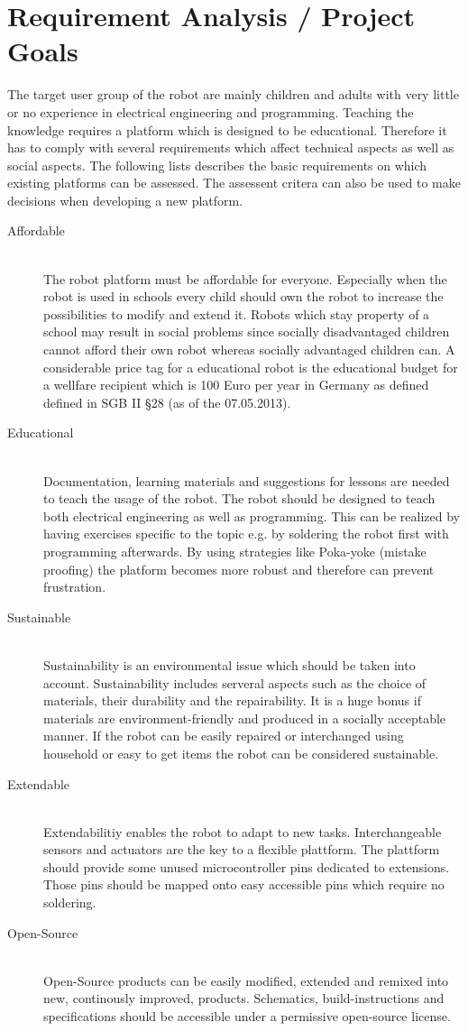\documentclass[twocolumn]{article}
\begin{document}
\section{Requirement Analysis / Project Goals}
The target user group of the robot are mainly children and adults with very little or no experience in electrical engineering and programming. Teaching the knowledge requires a platform which is designed to be educational. Therefore it has to comply with several requirements which affect technical aspects as well as social aspects.
The following lists describes the basic requirements on which existing platforms can be assessed. The assessent critera can also be used to make decisions when developing a new platform.
\begin{description}
\item[Affordable] \hfill \\ The robot platform must be affordable for everyone. Especially when the robot is used in schools every child should own the robot to increase the possibilities to modify and extend it. Robots which stay property of a school may result in social problems since socially disadvantaged children cannot afford their own robot whereas socially advantaged children can. A considerable price tag for a educational robot is the educational budget for a wellfare recipient which is 100 Euro per year in Germany as defined defined in SGB II §28 (as of the 07.05.2013).
\item[Educational] \hfill \\ Documentation, learning materials and suggestions for lessons are needed to teach the usage of the robot. The robot should be designed to teach both electrical engineering as well as programming. This can be realized by having exercises specific to the topic e.g. by soldering the robot first with programming afterwards. By using strategies like Poka-yoke (mistake proofing) the platform becomes more robust and therefore can prevent frustration.
\item[Sustainable] \hfill \\ Sustainability is an environmental issue which should be taken into account. Sustainability includes serveral aspects such as the choice of materials, their durability and the repairability. It is a huge bonus if materials are environment-friendly and produced in a socially acceptable manner. If the robot can be easily repaired or interchanged using household or easy to get items the robot can be considered sustainable. 
\item[Extendable] \hfill \\ Extendabilitiy enables the robot to adapt to new tasks. Interchangeable sensors and actuators are the key to a flexible plattform. The plattform should provide some unused microcontroller pins dedicated to extensions. Those pins should be mapped onto easy accessible pins which require no soldering.  
\item[Open-Source] \hfill \\ Open-Source products can be easily modified, extended and remixed into new, continously improved, products. Schematics, build-instructions and specifications should be accessible under a permissive open-source license. 
\end{description}
\end{document}
